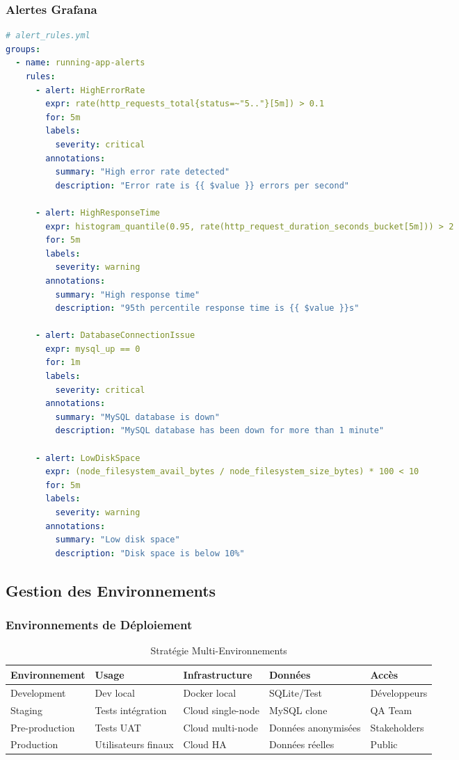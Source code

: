 \subsubsection{Alertes Grafana}

\begin{lstlisting}[language=yaml]
# alert_rules.yml
groups:
  - name: running-app-alerts
    rules:
      - alert: HighErrorRate
        expr: rate(http_requests_total{status=~"5.."}[5m]) > 0.1
        for: 5m
        labels:
          severity: critical
        annotations:
          summary: "High error rate detected"
          description: "Error rate is {{ $value }} errors per second"

      - alert: HighResponseTime
        expr: histogram_quantile(0.95, rate(http_request_duration_seconds_bucket[5m])) > 2
        for: 5m
        labels:
          severity: warning
        annotations:
          summary: "High response time"
          description: "95th percentile response time is {{ $value }}s"

      - alert: DatabaseConnectionIssue
        expr: mysql_up == 0
        for: 1m
        labels:
          severity: critical
        annotations:
          summary: "MySQL database is down"
          description: "MySQL database has been down for more than 1 minute"

      - alert: LowDiskSpace
        expr: (node_filesystem_avail_bytes / node_filesystem_size_bytes) * 100 < 10
        for: 5m
        labels:
          severity: warning
        annotations:
          summary: "Low disk space"
          description: "Disk space is below 10%"
\end{lstlisting}

\subsection{Gestion des Environnements}

\subsubsection{Environnements de Déploiement}

\begin{table}[H]
\centering
\begin{tabular}{|l|l|l|l|l|}
\hline
\textbf{Environnement} & \textbf{Usage} & \textbf{Infrastructure} & \textbf{Données} & \textbf{Accès} \\
\hline
Development & Dev local & Docker local & SQLite/Test & Développeurs \\
Staging & Tests intégration & Cloud single-node & MySQL clone & QA Team \\
Pre-production & Tests UAT & Cloud multi-node & Données anonymisées & Stakeholders \\
Production & Utilisateurs finaux & Cloud HA & Données réelles & Public \\
\hline
\end{tabular}
\caption{Stratégie Multi-Environnements}
\end{table}

